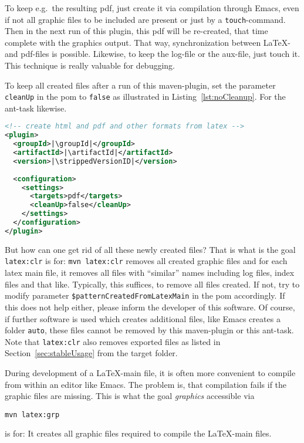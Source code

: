 To keep e.g.~the resulting pdf, 
just create it via compilation through Emacs, 
even if not all graphic files to be included are present 
or just by a \texttt{touch}-command. 
Then in the next run of this plugin, 
this pdf will be re-created, 
that time complete with the graphics output. 
That way, synchronization between \LaTeX- and pdf-files is possible. 
Likewise, to keep the log-file or the aux-file, just touch it. 
This technique is really valuable for debugging. 

To keep all created files after a run of this maven-plugin, 
set the parameter \texttt{cleanUp} in the pom 
to \texttt{false} as illustrated in Listing~\ref{lst:noCleanup}. 
For the ant-task likewise. 

\begin{lstlisting}[language=xml, basicstyle=\small,
escapechar=|,
float=b, captionpos=b, label={lst:noCleanup},
caption={Configuration without cleanup}]
<!-- create html and pdf and other formats from latex -->
<plugin>
  <groupId>|\groupId|</groupId>
  <artifactId>|\artifactId|</artifactId>
  <version>|\strippedVersionID|</version>
	
  <configuration>
    <settings>
      <targets>pdf</targets>
      <cleanUp>false</cleanUp>
    </settings>
  </configuration>
</plugin>
\end{lstlisting}


But how can one get rid of all these newly created files? 
That is what is the goal \texttt{latex:clr} is for: 
% 
\texttt{mvn latex:clr}
%
removes all created graphic files 
and for each latex main file, it removes all files with ``similar'' names
including log files, index files and that like.
Typically, this suffices, to remove all files created. 
If not, 
try to modify parameter \texttt{\$patternCreatedFromLatexMain} 
in the pom accordingly. 
If this does not help either, please inform the developer of this software. 
Of course, if further software is used which creates additional files, 
like Emacs creates a folder \texttt{auto}, 
these files cannot be removed by this maven-plugin or this ant-task.
Note that \texttt{latex:clr}
also removes exported files as listed in Section~\ref{sec:stableUsage}
from the target folder. 

During development of a \LaTeX-main file, 
it is often more convenient to compile from within an editor like Emacs. 
The problem is, that compilation fails if the graphic files are missing. 
This is what the goal {\em graphics\/} accessible via 
% 
\begin{Verbatim}
mvn latex:grp
\end{Verbatim}
%
is for: 
It creates all graphic files required to compile the \LaTeX-main files. 

